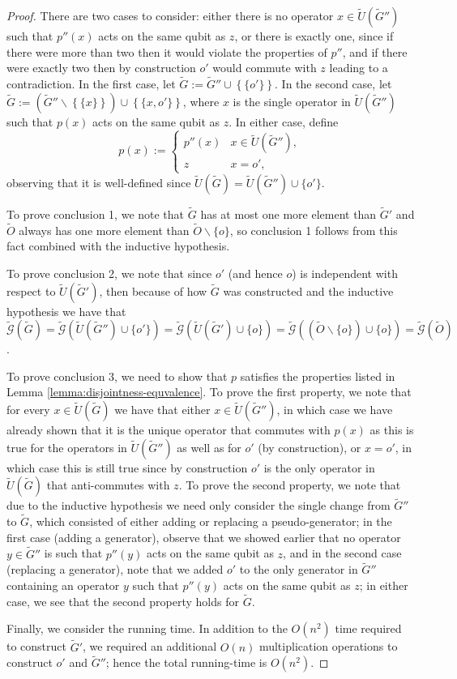\documentclass[12pt]{amsbook}
\theoremstyle{plain}
\theoremstyle{definition}
\theoremstyle{remark}
\newcommand{\set}{\tilde}
\newcommand{\genfun}{\tilde{\mathcal{G}}}
\newcommand{\paren}[1]{\left(#1\right)}
\begin{document}
\begin{proof}
There are two cases to consider:  either there is no operator $x\in\set U(\set G'')$ such that $p''(x)$ acts on the same qubit as $z$, or there is exactly one, since if there were more than two then it would violate the properties of $p''$, and if there were exactly two then by construction $o'$ would commute with $z$ leading to a contradiction.  In the first case, let $\set G:=\set G''\cup\left\{\{o'\}\right\}$.  In the second case, let $\set G:=\paren{\set G''\backslash\left\{\{x\}\right\}}\cup\left\{\{x,o'\}\right\}$, where $x$ is the single operator in $\set U(\set G'')$ such that $p(x)$ acts on the same qubit as $z$.   In either case, define
$$
p(x) :=
\begin{cases}
p''(x) & x\in \set U(\set G''), \\
z & x=o',
\end{cases}
$$
observing that it is well-defined since $\set U(\set G)=\set U(\set G'')\cup\{o'\}$.

To prove conclusion 1, we note that $\set G$ has at most one more element than $\set G'$ and $\set O$ always has one more element than $\set O\backslash\{o\}$, so conclusion 1 follows from this fact combined with the inductive hypothesis.

To prove conclusion 2, we note that since $o'$ (and hence $o$) is independent with respect to $\set U(\set G')$, then because of how $\set G$ was constructed and the inductive hypothesis we have that $\genfun(\set G)=\genfun\paren{\set U(\set G'')\cup\{o'\}}=\genfun\paren{\set U(\set G')\cup\{o\}}=\genfun\paren{(\set O\backslash\{o\})\cup\{o\}}=\genfun(\set O)$.

To prove conclusion 3, we need to show that $p$ satisfies the properties listed in Lemma \ref{lemma:disjointness-equvalence}.  To prove the first property, we note that for every $x\in\set U(\set G)$ we have that either $x\in\set U(\set G'')$, in which case we have already shown that it is the unique operator that commutes with $p(x)$ as this is true for the operators in $\set U(\set G'')$ as well as for $o'$ (by construction), or $x=o'$, in which case this is still true since by construction $o'$ is the only operator in $\set U(\set G)$ that anti-commutes with $z$.  To prove the second property, we note that due to the inductive hypothesis we need only consider the single change from $\set G''$ to $\set G$, which consisted of either adding or replacing a pseudo-generator;  in the first case (adding a generator), observe that we showed earlier that no operator $y\in\set G''$ is such that $p''(y)$ acts on the same qubit as $z$, and in the second case (replacing a generator), note that we added $o'$ to the only generator in $\set G''$ containing an operator $y$ such that $p''(y)$ acts on the same qubit as $z$;  in either case, we see that the second property holds for $\set G$.

Finally, we consider the running time.  In addition to the $O(n^2)$ time required to construct $\set G'$, we required an additional $O(n)$ multiplication operations to construct $o'$ and $\set G''$;  hence the total running-time is $O(n^2)$.
\end{proof}
\end{document}
